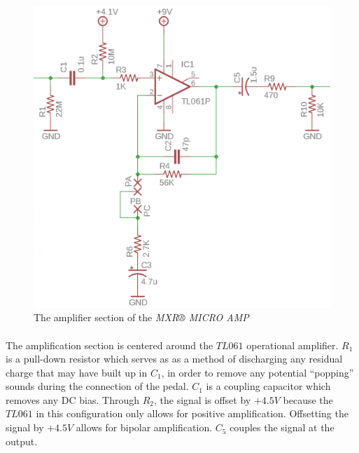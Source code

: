 \documentclass[a4paper, 12pt]{article}
\begin{document}
\begin{figure}[ht]
	\centering
	\includegraphics{img/mxr-amp}
	\caption{The amplifier section of the \textit{MXR® MICRO AMP}}
	\label{fig:mxr-amp}
\end{figure}

\paragraph*{}
The amplification section is centered around the $TL061$ operational 
amplifier. $R_1$ is a pull-down resistor which serves as as a method of 
discharging any residual charge that may have built up in $C_1$, in order to 
remove any potential ``popping'' sounds during the connection of the pedal. 
$C_1$ is a coupling capacitor which removes any DC bias. Through $R_2$, the 
signal is offset by $+4.5\si{V}$ because the $TL061$ in this configuration 
only allows for positive amplification. Offsetting the signal by $+4.5\si{V}$ 
allows for bipolar amplification. $C_5$ couples the signal at the output.
\end{document}
